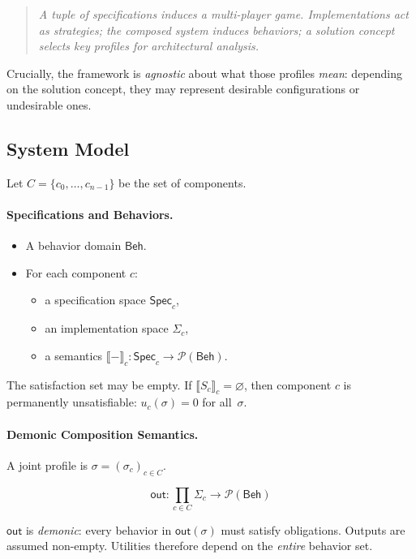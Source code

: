 \begin{quote}
\emph{A tuple of specifications induces a multi-player game.
Implementations act as strategies; the composed system induces behaviors; a solution concept selects key profiles for architectural analysis.}
\end{quote}

Crucially, the framework is \emph{agnostic} about what those profiles \emph{mean}: depending on the solution concept, they may represent desirable configurations or undesirable ones.

\subsection{System Model}

Let $C=\{c_0,\dots,c_{n-1}\}$ be the set of components.

\paragraph{Specifications and Behaviors.}

\begin{itemize}
\item A behavior domain $\mathsf{Beh}$.
\item For each component $c$:
  \begin{itemize}
  \item a specification space $\mathsf{Spec}_c$,
  \item an implementation space $\Sigma_c$,
  \item a semantics $\llbracket - \rrbracket_c : \mathsf{Spec}_c \to \mathcal P(\mathsf{Beh})$.
  \end{itemize}
\end{itemize}

The satisfaction set may be empty.
If $\llbracket S_c \rrbracket_c = \varnothing$, then component $c$ is permanently unsatisfiable: $u_c(\sigma)=0$ for all~$\sigma$.

\paragraph{Demonic Composition Semantics.}

A joint profile is $\sigma=(\sigma_c)_{c\in C}$.

\[
\mathsf{out} : \prod_{c\in C}\Sigma_c \to \mathcal P(\mathsf{Beh})
\]

$\mathsf{out}$ is \emph{demonic}: every behavior in $\mathsf{out}(\sigma)$ must satisfy obligations.
Outputs are assumed non-empty.
Utilities therefore depend on the \emph{entire} behavior set.

